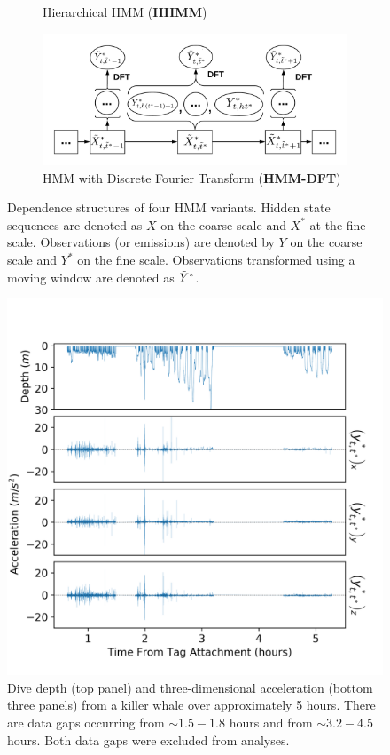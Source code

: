 \begin{figure}[ht]
\begin{subfigure}{\textwidth}
      \caption{Hierarchical HMM (\textbf{HHMM})}
      \label{fig:HHMM}
    \end{subfigure}
    \newline
    \begin{subfigure}{\textwidth}
      \centering
      \includegraphics[width=4in]{../Plots/HMM-DFT.png}  
      \caption{HMM with Discrete Fourier Transform (\textbf{HMM-DFT})}
      \label{fig:HMM-DFT}
    \end{subfigure}
    \caption{Dependence structures of four HMM variants. Hidden state sequences are denoted as $X$ on the coarse-scale and $X^*$ at the fine scale. Observations (or emissions) are denoted by $Y$ on the coarse scale and $Y^*$ on the fine scale. Observations transformed using a moving window are denoted as $\tilde{Y}^*$.}
    \label{fig:models}
\end{figure}


\begin{figure}[ht]
	\centering
	\includegraphics[width=5.25in]{../Plots/raw_data.png}
	\caption{Dive depth (top panel) and three-dimensional acceleration (bottom three panels) from a killer whale over approximately 5 hours. There are data gaps occurring from $\sim 1.5-1.8$ hours and from $\sim 3.2-4.5$ hours. Both data gaps were excluded from analyses.}
	\label{fig:data}
\end{figure}

